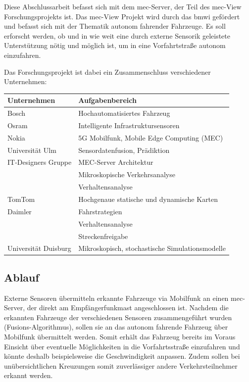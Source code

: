 Diese Abschlussarbeit befasst sich mit dem \gls{mec}-Server, der Teil des \gls{mec}-View Forschungsprojekts ist.
Das \gls{mec}-View Projekt wird durch das \gls{bmwi} gefördert und befasst sich mit der Thematik autonom fahrender Fahrzeuge.
Es soll erforscht werden, ob und in wie weit eine durch externe Sensorik geleistete Unterstützung nötig und möglich ist, um in eine Vorfahrtstraße autonom einzufahren.

Das Forschungsprojekt ist dabei ein Zusammenschluss verschiedener Unternehmen:
\begin{center}
	\begin{tabular}{l|l}		
		Unternehmen & Aufgabenbereich \\ \hline \hline
		Bosch & Hochautomatisiertes Fahrzeug \\
		Osram & \glqq{}Intelligente\grqq{} Infrastruktursensoren \\ 
		Nokia & 5G Mobilfunk, Mobile Edge Computing (MEC) \\
		Universität Ulm & Sensordatenfusion, Prädiktion \\
		\rowcolor{lightgray!20} IT-Designers Gruppe & MEC-Server Architektur\\
		\rowcolor{lightgray!20} & Mikroskopische Verkehrsanalyse \\
		\rowcolor{lightgray!20} & Verhaltensanalyse \\
		TomTom & Hochgenaue statische und dynamische Karten \\
		Daimler & Fahrstrategien \\
		& Verhaltensanalyse \\
		& Streckenfreigabe \\
		Universität Duisburg & Mikroskopisch, stochastische Simulationsmodelle
	\end{tabular}
\end{center}


\subsection{Ablauf}
Externe Sensoren übermitteln erkannte Fahrzeuge via Mobilfunk an einen \gls{mec}-Server, der direkt am Empfängerfunkmast angeschlossen ist. 
Nachdem die erkannten Fahrzeuge der verschiedenen Sensoren zusammengeführt wurden (Fusions-Algorithmus), sollen sie an das autonom fahrende Fahrzeug über Mobilfunk übermittelt werden.
Somit erhält das Fahrzeug bereits im Voraus Einsicht über eventuelle Möglichkeiten in die Vorfahrtsstraße einzufahren und könnte deshalb beispielsweise die Geschwindigkeit anpassen.
Zudem sollen bei unübersichtlichen Kreuzungen somit zuverlässiger andere Verkehrsteilnehmer erkannt werden.

